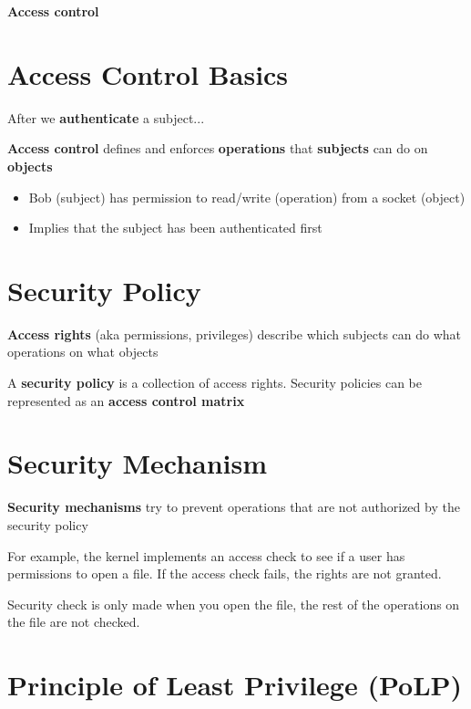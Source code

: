 \documentclass[11pt]{article}
\begin{document}
\begin{center}
  {\LARGE \textbf{Access control}}
\end{center}

\vspace{1cm}

\section*{Access Control Basics}

After we \textbf{authenticate} a subject...

\textbf{Access control} defines and enforces \textbf{operations} that \textbf{subjects} can do on \textbf{objects}

\begin{itemize}
	\item Bob (subject) has permission to read/write (operation) from a socket (object)
	\item Implies that the subject has been authenticated first
\end{itemize}

\section*{Security Policy}

\textbf{Access rights} (aka permissions, privileges) describe which subjects can do what operations on what objects

A \textbf{security policy} is a collection of access rights. Security policies can be represented as an \textbf{access control matrix}

\section*{Security Mechanism}

\textbf{Security mechanisms} try to prevent operations that are not authorized by the security policy

For example, the kernel implements an access check to see if a user has permissions to open a file. If the access check fails, the rights are not granted. 

Security check is only made when you open the file, the rest of the operations on the file are not checked. 

\section*{Principle of Least Privilege (PoLP)}
\end{document}
